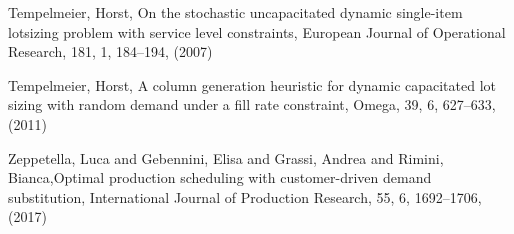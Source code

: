 \documentclass[10pt]{article}
\begin{document}
\begin{thebibliography}{99}
Tempelmeier, Horst, On the stochastic uncapacitated dynamic single-item lotsizing problem with service level constraints, European Journal of Operational Research, 181, 1, 184--194, (2007)
 

Tempelmeier, Horst, A column generation heuristic for dynamic capacitated lot sizing with random demand under a fill rate constraint, Omega, 39, 6, 627--633, (2011)
 

Zeppetella, Luca and Gebennini, Elisa and Grassi, Andrea and Rimini, Bianca,Optimal production scheduling with customer-driven demand substitution, International Journal of Production Research, 55, 6, 1692--1706, (2017)


 



\end{thebibliography}
\end{document}
